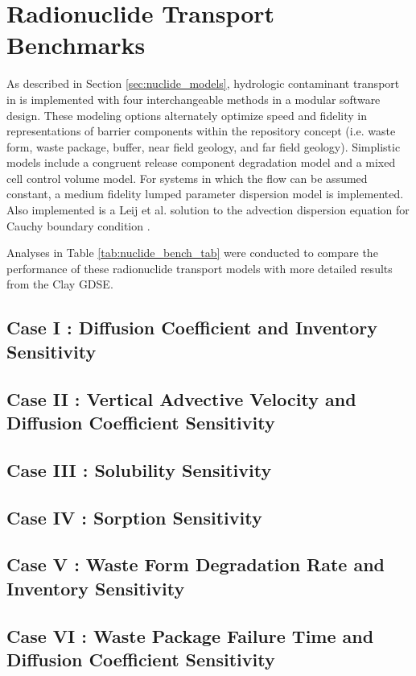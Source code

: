\section{Radionuclide Transport Benchmarks}\label{sec:nuclide_benchmarks}

As described in Section \ref{sec:nuclide_models}, hydrologic contaminant 
transport in \Cyder is implemented with four interchangeable  methods in a 
modular software design. These modeling options alternately optimize speed and 
fidelity in representations of barrier components within the repository concept 
(i.e. waste form, waste package, buffer, near field geology, and far field 
geology)\cite{huff_hydrologic_2013}.  Simplistic models include a congruent 
release component degradation model and a mixed cell control volume model. For 
systems in which the flow can be assumed constant, a medium fidelity lumped 
parameter dispersion model is implemented. Also implemented is a Leij et al. 
solution to the advection dispersion equation for Cauchy boundary condition 
\cite{leij_analytical_1991, van_genuchten_analytical_1982}.  

Analyses in Table \ref{tab:nuclide_bench_tab} were conducted to compare the 
performance of these radionuclide transport models with more detailed results from the 
Clay \gls{GDSE}. 




\subsection{Case I : Diffusion Coefficient and Inventory Sensitivity}
\subsection{Case II : Vertical Advective Velocity and Diffusion Coefficient Sensitivity}
\subsection{Case III : Solubility Sensitivity}
\subsection{Case IV : Sorption Sensitivity}
\subsection{Case V : Waste Form Degradation Rate and Inventory Sensitivity}
\subsection{Case VI : Waste Package Failure Time and Diffusion Coefficient Sensitivity}
